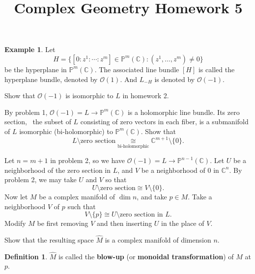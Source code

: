 \documentclass[12pt]{article}
\title{Complex Geometry Homework 5}
\author{}
\date{}
\theoremstyle{definition}\newtheorem*{example*}{Example}
\theoremstyle{definition}\newtheorem*{definition*}{Definition}
\begin{document}
\maketitle
\begin{example*}
  Let \[
    H=\{[0:z^1:\cdots :z^m]\in \mathbb{P}^m(\mathbb{C}):(z^1,\ldots,z^m)\neq 0\}
  \] be the hyperplane in \(\mathbb{P}^m(\mathbb{C})\). The associated line bundle
  \([H]\) is called the hyperplane bundle, denoted by \(\mathcal{O}(1)\). And
  \(L_{-H}\) is denoted by \(\mathcal{O}(-1)\).
\end{example*}

\begin{problem}
  Show that \(\mathcal{O}(-1)\) is isomorphic to \(L\) in homework 2.
\end{problem}
\begin{problem}
  By problem 1, \(\mathcal{O}(-1)=L\to \mathbb{P}^m(\mathbb{C})\) is a holomorphic
  line bundle. Its zero section, \ie\ the subset of \(L\) consisting of zero vectors
  in each fiber, is a submanifold of \(L\) isomorphic (bi-holomorphic) to
  \(\mathbb{P}^m(\mathbb{C})\). Show that \[
    L\setminus\text{zero section}\underset{\text{bi-holomorphic}}{\cong}
    \mathbb{C}^{m+1}\setminus\{0\}
  .\] 
\end{problem}
\begin{problem}
  Let \(n=m+1\) in problem 2, so we have \(\mathcal{O}(-1)=L\to \mathbb{P}^{n-1}
  (\mathbb{C})\). Let \(U\) be a neighborhood of the zero section in \(L\), and
  \(V\) be a neighborhood of \(0\) in \(\mathbb{C}^n\). By problem 2, we may take
  \(U\) and \(V\) so that \[
    U\setminus\text{zero section}\cong V\setminus\{0\}
  .\] Now let \(M\) be a complex manifold of \(\dim n\), and take \(p\in M\). Take
  a neighborhood \(V\) of \(p\) such that \[
    V\setminus\{p\}\cong U\setminus\text{zero section in }L.
  \] Modify \(M\) be first removing \(V\) and then inserting \(U\) in the place
  of \(V\).

  Show that the resulting space \(\hat{M}\) is a complex manifold of dimension \(n\).
\end{problem}
\begin{definition*}
  \(\hat{M}\) is called the \textbf{blow-up} (or \textbf{monoidal transformation}) of
  \(M\) at \(p\).
\end{definition*}
\end{document}
